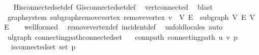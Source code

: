 \begin{isabellebody}
%
\isadelimproof
\ \ %
\endisadelimproof
%
\isatagproof
{}\isamarkupfalse%
\ H{\isachardot}{\kern0pt}is{\isacharunderscore}{\kern0pt}connected{\isacharunderscore}{\kern0pt}set{\isacharunderscore}{\kern0pt}def\ G{\isachardot}{\kern0pt}is{\isacharunderscore}{\kern0pt}connected{\isacharunderscore}{\kern0pt}set{\isacharunderscore}{\kern0pt}def\ \isamarkupfalse%
\ vert{\isacharunderscore}{\kern0pt}connected\ \isamarkupfalse%
\ blast%
\endisatagproof
{\isafoldproof}%
%
\isadelimproof
\isanewline
%
\endisadelimproof
\isanewline
{}\isamarkupfalse%
\isanewline
\isanewline
{}\isamarkupfalse%
\ {\isacharparenleft}{\kern0pt}\ graph{\isacharunderscore}{\kern0pt}system{\isacharparenright}{\kern0pt}\ subgraph{\isacharunderscore}{\kern0pt}remove{\isacharunderscore}{\kern0pt}vertex{\isacharcolon}{\kern0pt}\ {\isachardoublequoteopen}remove{\isacharunderscore}{\kern0pt}vertex\ v\ {\isacharequal}{\kern0pt}\ {\isacharparenleft}{\kern0pt}V{\isacharprime}{\kern0pt}{\isacharcomma}{\kern0pt}\ E{\isacharprime}{\kern0pt}{\isacharparenright}{\kern0pt}\ {\isasymLongrightarrow}\ subgraph\ V{\isacharprime}{\kern0pt}\ E{\isacharprime}{\kern0pt}\ V\ E{\isachardoublequoteclose}\isanewline
%
\isadelimproof
\ \ %
\endisadelimproof
%
\isatagproof
{}\isamarkupfalse%
\ wellformed\ \isamarkupfalse%
\ remove{\isacharunderscore}{\kern0pt}vertex{\isacharunderscore}{\kern0pt}def\ incident{\isacharunderscore}{\kern0pt}def\ \isamarkupfalse%
\ {\isacharparenleft}{\kern0pt}unfold{\isacharunderscore}{\kern0pt}locales{\isacharcomma}{\kern0pt}\ auto{\isacharparenright}{\kern0pt}%
\endisatagproof
{\isafoldproof}%
%
\isadelimproof
%
\endisadelimproof
%
\isadelimdocument
%
\endisadelimdocument
%
\isatagdocument
%
\isamarkuptrue%
%
\endisatagdocument
{\isafolddocument}%
%
\isadelimdocument
%
\endisadelimdocument
{}\isamarkupfalse%
\ {\isacharparenleft}{\kern0pt}\ ulgraph{\isacharparenright}{\kern0pt}\ connecting{\isacharunderscore}{\kern0pt}path{\isacharunderscore}{\kern0pt}connected{\isacharunderscore}{\kern0pt}set{\isacharcolon}{\kern0pt}\isanewline
\ \ \ conn{\isacharunderscore}{\kern0pt}path{\isacharcolon}{\kern0pt}\ {\isachardoublequoteopen}connecting{\isacharunderscore}{\kern0pt}path\ u\ v\ p{\isachardoublequoteclose}\isanewline
\ \ \ {\isachardoublequoteopen}is{\isacharunderscore}{\kern0pt}connected{\isacharunderscore}{\kern0pt}set\ {\isacharparenleft}{\kern0pt}set\ p{\isacharparenright}{\kern0pt}{\isachardoublequoteclose}\isanewline

\end{isabellebody}
